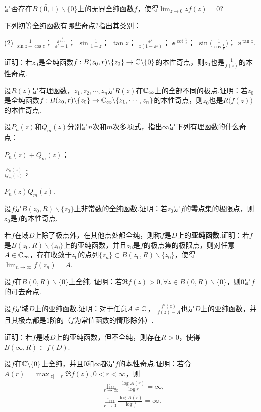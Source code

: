 \begin{xiti}
\item 是否存在$\bar{B(0,1)}\backslash\{0\}$上的无界全纯函数$f$，使得$\lim_{z\to0}zf(z)=0$?
\item 下列初等全纯函数有哪些奇点?指出其类别：
\begin{tasks}(2)
\task $\frac1{\sin z-\cos z}$；
\task $\frac{\ee^{\frac1{1-z}}}{\ee^z-1}$；
\task $\sin\frac1{1-z}$；
\task $\tan z$；
\task $\frac{\ee^z}{z(1-\ee^z)}$；
\task $\ee^{\cot\frac1z}$；
\task $\sin\bigg(\frac1{\cos\frac1z}\bigg)$；
\task $\ee^{\tan z}$.
\end{tasks}
\item 证明：若$z_0$是全纯函数$f:B(z_0,r)\backslash\{z_0\}\to\mathbb C\backslash\{0\}$的本性奇点，则$z_0$也是$\frac1{f(z)}$的本性奇点.
\item 设$R(z)$是有理函数，$z_1,z_2,\cdots,z_n$是$R(z)$在$\mathbb C_\infty$上的全部不同的极点.证明：若$z_0$是全纯函数$f:B(z_0,r)\backslash\{z_0\}\to\mathbb C_\infty\backslash
    \{z_1,\cdots,z_n\}$的本性奇点，则$z_0$也是$R\big(f(z)\big)$的本性奇点.
\item 设$P_n(z)$和$Q_m(z)$分别是$n$次和$m$次多项式，指出$\infty$是下列有理函数的什么奇点：
\begin{enuma}
  \item $P_n(z)+Q_m(z)$；
  \item $\frac{P_n(z)}{Q_m(z)}$；
  \item $P_n(z)Q_m(z)$.
\end{enuma}
\item 设$f$是$B(z_0,R)\backslash\{z_0\}$上非常数的全纯函数.证明：若$z_0$是$f$的零点集的极限点，则$z_0$是$f$的本性奇点.
\item 若$f$在域$D$上除了极点外，在其他点处都全纯，则称$f$是$D$上的\textbf{亚纯函数}.证明：若$f$是$B(z_0,R)\backslash\{z_0\}$上的亚纯函数，并且$z_0$是$f$的极点集的极限点，则对任意$A\in \mathbb C_\infty$，存在收敛于$z_0$的点列$\{z_n\}\subset B(z_0,R)\backslash\{z_0\}$，使得$\lim_{n\to\infty}f(z_n)=A$.
\item 设$f$在$B(0,R)\backslash\{0\}$上全纯. 证明：若$\Re f(z)>0,\forall z\in B(0,R)\backslash\{0\}$，则$0$是$f$的可去奇点.
\item 设$f$是域$D$上的亚纯函数.证明：对于任意$A\in \mathbb C$，
$\frac{f'(z)}{f(z)-A}$也是$D$上的亚纯函数，并且其极点都是$1$阶的（$f$为常值函数的情形除外）.
\item 证明：若$f$是域$D$上的亚纯函数，但不全纯，则存在$R>0$，使得$B(\infty,R)\subset f(D)$.
\item 设$f$在$\mathbb C\backslash\{0\}$上全纯，并且$0$和$\infty$都是$f$的本性奇点.证明：若令$A(r)=\max_{|z|=r}\Re f(z),0<r<\infty$，则
    \begin{align*}
    &\lim_{r\to\infty}\frac{\log A(r)}{\log r}=\infty,\\
    &\lim_{r\to0}\frac{\log A(r)}{\log\frac1r}=\infty.
    \end{align*}
\end{xiti}

